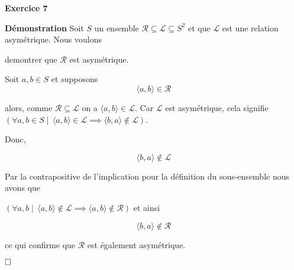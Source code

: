 \documentclass{article}
\begin{document}
\textbf{Exercice 7}

\vspace{0.5cm}

\textbf{Démonstration} Soit $S$ un ensemble $ \mathcal{R} \subseteq \mathcal{L} \subseteq S^2 $ et que \( \mathcal{L} \) est une relation asymétrique. Nous voulons 

demontrer que \( \mathcal{R} \) est asymétrique.

Soit $a, b \in S$ et supposons
$$ \langle a, b \rangle \in \mathcal{R} $$

alors, comme $ \mathcal{R} \subseteq \mathcal{L} $ on a $\langle a, b \rangle \in \mathcal{L}$. Car $\mathcal{L}$ est asymétrique, cela signifie $\left(\forall a, b \in S \mid \,  \langle a, b \rangle \in \mathcal{L} \implies \langle b,a  \rangle \notin \mathcal{L} \right)$. 

Donc,

$$\langle b, a \rangle \notin \mathcal{L}$$

Par la contrapositive de l'implication pour la définition du sous-ensemble nous avons que 

$\left(\forall  a, b \mid \,  \langle a, b \rangle \notin \mathcal{L} \implies \langle a, b \rangle \notin \mathcal{R} \right)$ et ainsi

$$\langle b,a \rangle \notin \mathcal{R}$$

ce qui confirme que $ \mathcal{R}$ est également asymétrique.

$\hfill \square$
\end{document}
